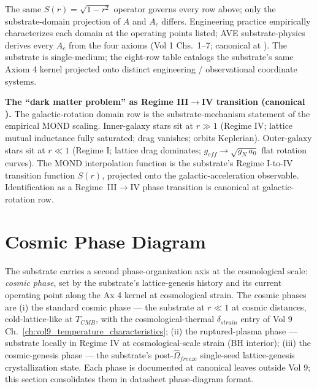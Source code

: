 \noindent
The same $S(r) = \sqrt{1 - r^2}$ operator governs every row above; only the substrate-domain projection of $A$ and $A_c$ differs. Engineering practice empirically characterizes each domain at the operating points listed; AVE substrate-physics derives every $A_c$ from the four axioms (Vol 1 Chs.~1--7; canonical at ). The substrate is single-medium; the eight-row table catalogs the substrate's same Axiom 4 kernel projected onto distinct engineering / observational coordinate systems.

\textbf{The ``dark matter problem'' as Regime III$\to$IV transition (canonical ).} The galactic-rotation domain row is the substrate-mechanism statement of the empirical MOND scaling. Inner-galaxy stars sit at $r \gg 1$ (Regime IV; lattice mutual inductance fully saturated; drag vanishes; orbits Keplerian). Outer-galaxy stars sit at $r \ll 1$ (Regime I; lattice drag dominates; $g_{eff} \to \sqrt{g_N\, a_0}$ flat rotation curves). The MOND interpolation function is the substrate's Regime I-to-IV transition function $S(r)$, projected onto the galactic-acceleration observable. Identification as a Regime~III$\to$IV phase transition is canonical at  galactic-rotation row.

\section{Cosmic Phase Diagram}
\label{sec:vol9_phase_cosmic}

The substrate carries a second phase-organization axis at the cosmological scale: \emph{cosmic phase}, set by the substrate's lattice-genesis history and its current operating point along the Ax 4 kernel at cosmological strain. The cosmic phases are (i) the standard cosmic phase --- the substrate at $r \ll 1$ at cosmic distances, cold-lattice-like at $T_{CMB}$, with the cosmological-thermal $\delta_{strain}$ entry of Vol 9 Ch.~\ref{ch:vol9_temperature_characteristics}; (ii) the ruptured-plasma phase --- substrate locally in Regime IV at cosmological-scale strain (BH interior); (iii) the cosmic-genesis phase --- the substrate's post-$\hat{\Omega}_{freeze}$ single-seed lattice-genesis crystallization state. Each phase is documented at canonical leaves outside Vol 9; this section consolidates them in datasheet phase-diagram format.

